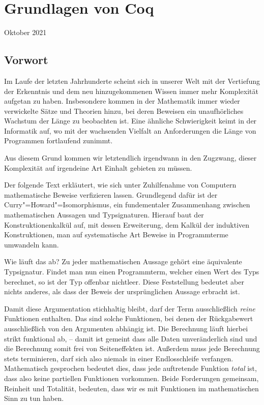 \documentclass[a4paper,10pt,fleqn,twocolumn,twoside,dvipdfmx]{scrartcl}
\numberwithin{equation}{section}
\begin{document}

\section*{\huge Grundlagen von Coq}

\vspace{1em}\noindent
{\large Oktober 2021}

\tableofcontents

\subsection*{Vorwort}

Im Laufe der letzten Jahrhunderte scheint sich in unserer Welt mit der
Vertiefung der Erkenntnis und dem neu hinzugekommenen Wissen immer mehr
Komplexität aufgetan zu haben. Insbesondere kommen in der Mathematik
immer wieder verwickelte Sätze und Theorien hinzu, bei deren Beweisen
ein unaufhörliches Wachstum der Länge zu beobachten ist. Eine ähnliche
Schwierigkeit keimt in der Informatik auf, wo mit der wachsenden
Vielfalt an Anforderungen die Länge von Programmen fortlaufend
zunimmt.

Aus diesem Grund kommen wir letztendlich irgendwann in den Zugzwang,
dieser Komplexität auf irgendeine Art Einhalt gebieten zu müssen.

Der folgende Text erkläutert, wie sich unter Zuhilfenahme von Computern
mathematische Beweise verfizieren lassen. 
Grundlegend dafür ist der Curry"=Howard"=Isomorphismus, ein
fundementaler Zusammenhang zwischen mathematischen Aussagen
und Typsignaturen. Hierauf baut der Konstruktionenkalkül auf,
mit dessen Erweiterung, dem Kalkül der induktiven Konstruktionen,
man auf systematische Art Beweise in Programmterme umwandeln kann.

Wie läuft das ab? Zu jeder mathematischen Aussage gehört eine
äquivalente Typsignatur. Findet man nun einen Programmterm, welcher
einen Wert des Typs berechnet, so ist der Typ offenbar nichtleer.
Diese Feststellung bedeutet aber nichts anderes, als dass der Beweis
der ursprünglichen Aussage erbracht ist.

Damit diese Argumentation stichhaltig bleibt, darf der Term
ausschließlich \emph{reine} Funktionen enthalten. Das sind solche
Funktionen, bei denen der Rückgabewert ausschließlich von den
Argumenten abhängig ist. Die Berechnung läuft hierbei strikt
funktional ab, -- damit ist gemeint dass alle Daten unveränderlich
sind und die Berechnung somit frei von Seiteneffekten ist.
Außerdem muss jede Berechnung stets terminieren, darf sich also niemals
in einer Endlosschleife verfangen. Mathematisch gesprochen bedeutet
dies, dass jede auftretende Funktion \emph{total} ist, dass also keine
partiellen Funktionen vorkommen. Beide Forderungen gemeinsam,
Reinheit und Totalität, bedeuten, dass wir es mit Funktionen
im mathematischen Sinn zu tun haben.
\end{document}
